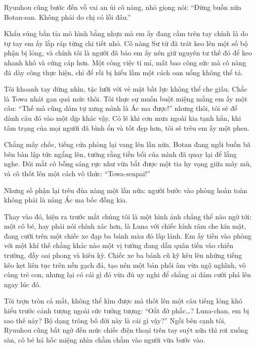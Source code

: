 \documentclass[../main.tex]{subfiles}
\begin{document}
Ryuuhou cũng bước đến vỗ vai an ủi cô nàng, nhỏ giọng nói: ``Đừng buồn nữa Botan-san. Không phải do chị có lỗi đâu.''

Khẩu súng bắn tỉa mô hình bằng nhựa mà em ấy đang cầm trên tay chính là do tự tay em ấy lắp ráp từng chi tiết nhỏ. Cô nàng Sư tử đã trát keo lên một số bộ phận bị lỏng, và chính tôi là người đã bảo em ấy nên giữ nguyên tư thế đó để keo nhanh khô và cứng cáp hơn. Một công việc tỉ mỉ, mất bao công sức mà cô nàng đã dày công thực hiện, chỉ để rồi bị hiểu lầm một cách oan uổng không thể tả.

Tôi khoanh tay đứng nhìn, tặc lưỡi với vẻ mặt bất lực không thể che giấu. Chắc là Towa nhát gan quá mức thôi. Tôi thực sự muốn buột miệng mắng em ấy một câu: ``Thế mà cũng dám tự xưng mình là Ác ma được!'' nhưng thôi, tôi sẽ để dành câu đó vào một dịp khác vậy. Có lẽ khi cơn mưa ngoài kia tạnh hẳn, khi tâm trạng của mọi người đã bình ổn và tốt đẹp hơn, tôi sẽ trêu em ấy một phen.

\ct

Chẳng mấy chốc, tiếng cửa phòng lại vang lên lần nữa. Botan đang ngồi buồn bã bên bàn lập tức ngẩng lên, tưởng rằng tiền bối của mình đã quay lại để lắng nghe. Đôi mắt cô bỗng sáng rực như vừa bắt được một tia hy vọng giữa mây mù, và cô thốt lên một cách vô thức: ``Towa-senpai!''

Nhưng số phận lại trêu đùa nàng một lần nữa: người bước vào phòng hoàn toàn không phải là nàng Ác ma bốc đồng kia.

Thay vào đó, hiện ra trước mắt chúng tôi là một hình ảnh chẳng thể nào ngờ tới: một cô bé, hay phải nói chính xác hơn, là Luna với chiếc kính râm che kín mặt, đang cưỡi trên một chiếc xe đạp ba bánh màu đỏ lấp lánh. Em ấy tiến vào phòng với một khí thế chẳng khác nào một vị tướng đang dẫn quân tiến vào chiến trường, đầy oai phong và kiêu kỳ. Chiếc xe ba bánh cũ kỹ kêu lên những tiếng kẽo kẹt liên tục trên nền gạch đá, tạo nên một bản phối âm vừa ngộ nghĩnh, vô cùng trẻ con, nhưng lại có cái gì đó vừa đủ uy nghi để chẳng ai dám cười phá lên ngay lúc đó.


Tôi trợn tròn cả mắt, không thể kìm được mà thốt lên một câu tiếng lóng khó hiểu trước cảnh tượng ngoài sức tưởng tượng: ``Oắt đờ phắc\dots? Luna-chan, em bị sao thế này? Bộ dạng trông bố đời này là cái gì vậy?'' Ngồi bên cạnh tôi, Ryuuhou cũng bất ngờ đến mức chiếc điện thoại trên tay suýt nữa thì rơi xuống sàn, cô bé há hốc miệng nhìn chằm chằm vào người vừa bước vào.
\end{document}
